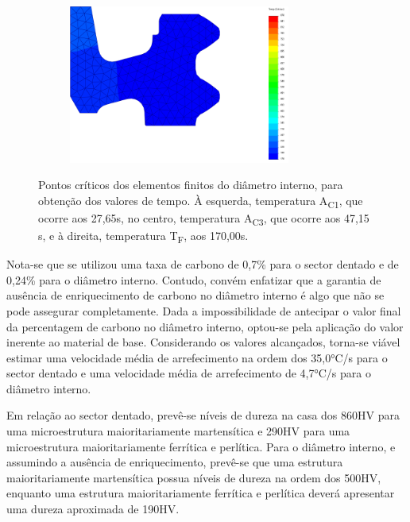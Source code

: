 \begin{figure}[htb]
\begin{subfigure}{.33\textwidth}
        \caption{}
        \label{fig:A1_Dint}
    \end{subfigure}
    \begin{subfigure}{.33\textwidth}
        \centering
        \includegraphics[width = 0.8\textwidth]{Figures/Cap4/TF_Diametro.png}
        \caption{}
        \label{fig:Tf_Dint}
    \end{subfigure}
    \caption[Pontos críticos dos elementos finitos do diâmetro interno]%
    {Pontos críticos dos elementos finitos do diâmetro interno, para obtenção dos valores de tempo. À esquerda, temperatura A\textsubscript{C1}, que ocorre aos 27,65s, no centro, temperatura A\textsubscript{C3}, que ocorre aos 47,15 s, e à direita, temperatura T\textsubscript{F}, aos 170,00s.}
    \label{fig:Diametro}
\end{figure}
\par
Nota-se que se utilizou uma taxa de carbono de 0,7\% para o sector dentado e de 0,24\% para o diâmetro interno. Contudo, convém enfatizar que a garantia de ausência de enriquecimento de carbono no diâmetro interno é algo que não se pode assegurar completamente. Dada a impossibilidade de antecipar o valor final da percentagem de carbono no diâmetro interno, optou-se pela aplicação do valor inerente ao material de base. Considerando os valores alcançados, torna-se viável estimar uma velocidade média de arrefecimento na ordem dos 35,0°C/s para o sector dentado e uma velocidade média de arrefecimento de 4,7°C/s para o diâmetro interno.
\par
Em relação ao sector dentado, prevê-se níveis de dureza na casa dos 860HV para uma microestrutura maioritariamente martensítica e 290HV para uma microestrutura maioritariamente ferrítica e perlítica. Para o diâmetro interno, e assumindo a ausência de enriquecimento, prevê-se que uma estrutura maioritariamente martensítica possua níveis de dureza na ordem dos 500HV, enquanto uma estrutura maioritariamente ferrítica e perlítica deverá apresentar uma dureza aproximada de 190HV.
